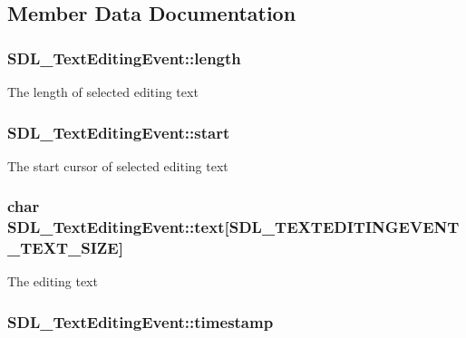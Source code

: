 \subsection{Member Data Documentation}
\hypertarget{struct_s_d_l___text_editing_event_adca95505c0bf212834930df58f6d1aa5}{
\subsubsection[{length}]{ S\-D\-L\-\_\-\-Text\-Editing\-Event\-::length}}\label{struct_s_d_l___text_editing_event_adca95505c0bf212834930df58f6d1aa5}
The length of selected editing text \hypertarget{struct_s_d_l___text_editing_event_ac6c6a00835d92b12c0ba5b78b5ad676d}{
\subsubsection[{start}]{ S\-D\-L\-\_\-\-Text\-Editing\-Event\-::start}}\label{struct_s_d_l___text_editing_event_ac6c6a00835d92b12c0ba5b78b5ad676d}
The start cursor of selected editing text \hypertarget{struct_s_d_l___text_editing_event_a29848c2e7819ea98ae8fb08543e6d420}{
\subsubsection[{text}]{\setlength{\rightskip}{0pt plus 5cm}char S\-D\-L\-\_\-\-Text\-Editing\-Event\-::text\mbox{[}{\bf S\-D\-L\-\_\-\-T\-E\-X\-T\-E\-D\-I\-T\-I\-N\-G\-E\-V\-E\-N\-T\-\_\-\-T\-E\-X\-T\-\_\-\-S\-I\-Z\-E}\mbox{]}}}\label{struct_s_d_l___text_editing_event_a29848c2e7819ea98ae8fb08543e6d420}
The editing text \hypertarget{struct_s_d_l___text_editing_event_afc164f40abee6fd8e72e01b589210c75}{
\subsubsection[{timestamp}]{ S\-D\-L\-\_\-\-Text\-Editing\-Event\-::timestamp}}\label{struct_s_d_l___text_editing_event_afc164f40abee6fd8e72e01b589210c75}
